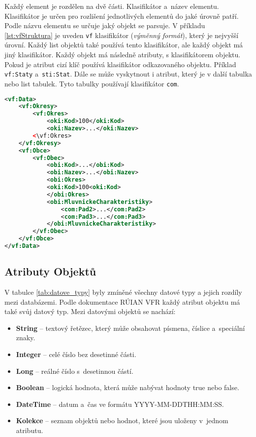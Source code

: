 Každý element je rozdělen na dvě části.
Klasifikátor a~název elementu.
Klasifikátor je určen pro rozlišení jednotlivých elementů do jaké úrovně patří.
Podle názvu elementu se určuje jaký objekt se parsuje.
V příkladu \ref{lst:vfStruktura} je uveden \texttt{vf} klasifikátor (\textit{výměnný formát}), který je nejvyšší úrovní.
Každý list objektů také používá tento klasifikátor, ale každý objekt má jiný klasifikátor.
Každý objekt má následně atributy, s klasifikátorem objektu. Pokud je atribut cizí klíč používá klasifikátor odkazovaného objektu.
Příklad \texttt{vf:Staty} a~\texttt{sti:Stat}.
Dále se může vyskytnout i atribut, který je v další tabulka nebo list tabulek. Tyto tabulky používají klasifikátor \texttt{com}.
\small
\begin{lstlisting}[language=xml, caption={Příklad Klasifikátorů}, label=lst:klasifikator]
<vf:Data>
    <vf:Okresy>
        <vf:Okres>
            <oki:Kod>100</oki:Kod>
            <oki:Nazev>...</oki:Nazev>
        <\vf:Okres>
    </vf:Okresy>
    <vf:Obce>
        <vf:Obec>
            <obi:Kod>...</obi:Kod>
            <obi:Nazev>...</obi:Nazev>
            <obi:Okres>
            <oki:Kod>100<oki:Kod>
            </obi:Okres>
            <obi:MluvnickeCharakteristiky>
                <com:Pad2>...</com:Pad2>
                <com:Pad3>...</com:Pad3>
            </obi:MluvnickeCharakteristiky>
        </vf:Obec>
    </vf:Obce>
</vf:Data>
\end{lstlisting}
\normalsize

\subsection{Atributy Objektů}
V tabulce \ref{tab:datove_typy} byly zmíněné všechny datové typy a jejich rozdíly mezi databázemi.
Podle dokumentace RÚIAN VFR \cite{ruian_vfr} každý atribut objektu má také svůj datový typ.
Mezi datovými objektů se nachází:
\begin{itemize}
    \item \textbf{String} -- textový řetězec, který může obsahovat písmena, číslice a~speciální znaky.
    \item \textbf{Integer} -- celé číslo bez desetinné části.
    \item \textbf{Long} -- reálné číslo s~desetinnou částí.
    \item \textbf{Boolean} -- logická hodnota, která může nabývat hodnoty true nebo false.
    \item \textbf{DateTime} -- datum a~čas ve formátu YYYY-MM-DDTHH:MM:SS.
    \item \textbf{Kolekce} -- seznam objektů nebo hodnot, které jsou uloženy v~jednom atributu.
\end{itemize}

